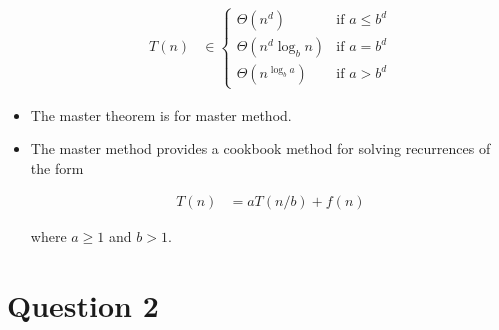 \documentclass[12pt]{article}
\begin{document}
\begin{itemize}
    \begin{align}
        T(n) &\in \begin{cases}
        \Theta(n^d) & \text{if $a \leq b^d$}\\
        \Theta(n^d\log_b n) & \text{if $a = b^d$}\\
        \Theta(n^{\log_b a}) & \text{if $a > b^d$}
        \end{cases}
    \end{align}

    \item The master theorem is for master method.
    \item The master method provides a cookbook method for solving recurrences
    of the form

    \begin{align}
        T(n) &= aT(n/b) + f(n)
    \end{align}

    \bigskip

    where $a \geq 1$ and $b > 1$.
\end{itemize}

\bigskip

\section*{Question 2}

\bigskip
\end{document}
